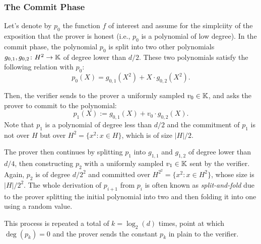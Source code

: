 

\subsubsection*{The Commit Phase}

Let's denote by $p_0$ the function $f$ of interest and assume for the simplciity of the exposition that the prover is honest (i.e., $p_0$ is a polynomial of low degree).
In the commit phase, the polynomial $p_0$ is split into two other polynomials $g_{0, 1}, g_{0, 2} \colon H^2 \to \mathbb{K}$ of degree lower than $d/2$. These two polynomials satisfy the following relation with $p_0$:
\begin{equation}\label{eq:FRI-relation}
p_0(X) = g_{0, 1}(X^2) + X \cdot g_{0, 2}(X^2).
\end{equation}

Then, the verifier sends to the prover a uniformly sampled $v_0 \in \mathbb{K}$, and asks the prover to commit to the polynomial:
\[
p_1(X) := g_{0, 1}(X) + v_0 \cdot g_{0, 2}(X).
\]
Note that $p_1$ is a polynomial of degree less than $d/2$ and the commitment of $p_1$ is not over $H$ but over $H^2 = \{x^2 \colon x \in H\}$, which is of size $|H|/2$.

The prover then continues by splitting $p_1$ into $g_{1, 1}$ and $g_{1, 2}$ of degree lower than $d/4$, then constructing $p_2$ with a uniformly sampled $v_1 \in \mathbb{K}$ sent by the verifier. Again, $p_2$ is of degree $d/2^2$ and committed over $H^{2^2} = \{x^{2} \colon x \in H^2\}$, whose size is $|H|/2^2$. The whole derivation of $p_{i+1}$ from $p_i$ is often known as \textit{split-and-fold} due to the prover splitting the initial polynomial into two and then folding it into one using a random value. 

This process is repeated a total of $k = \log_2(d)$ times, point at which $\deg(p_k) = 0$ and the prover sends the constant $p_k$ in plain to the verifier.


